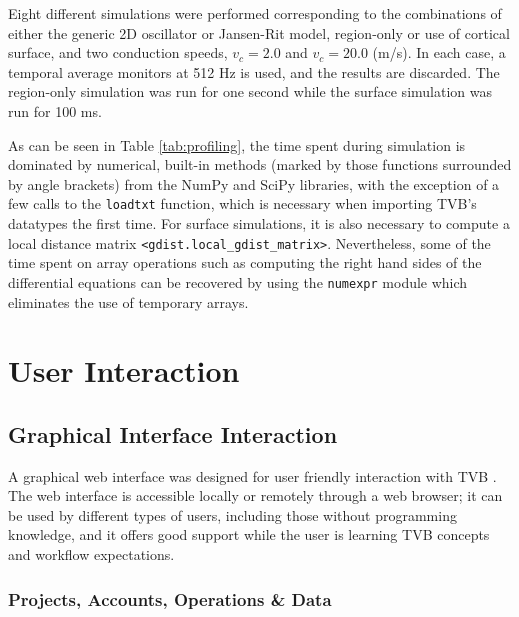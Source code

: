 \documentclass{bioinfo}
\begin{document}
	Eight different simulations were performed corresponding to the combinations of
	either the generic 2D oscillator or Jansen-Rit model, region-only
	or use of cortical surface, and two conduction speeds, $v_c = 2.0$ and
	$v_c = 20.0$ (m/s). In each case, a temporal average monitors at 512 Hz
	is used, and the results are discarded. The region-only simulation was
	run for one second while the surface simulation was run for 100 ms. 

	

	As can be seen in Table \ref{tab:profiling}, the time spent during simulation
	is dominated by numerical, built-in methods (marked by those functions surrounded by angle
	brackets) from the NumPy and SciPy libraries, with the exception of a few
	calls to the \texttt{loadtxt} function, which is necessary when importing TVB's
	datatypes the first time. For surface simulations, it is also necessary to compute
	a local distance matrix \texttt{<gdist.local\_gdist\_matrix>}. Nevertheless, 
	some of the time spent on array operations such as computing the right hand sides 
	of the differential equations can be 
	recovered by using the \texttt{numexpr} module which eliminates the 
	use of temporary arrays. 


%	

\section{User Interaction}

\subsection{Graphical Interface Interaction}

		A graphical web interface was designed for user friendly
		interaction with TVB . The web interface is accessible locally or
		remotely through a web browser; it can be used by different types of
		users, including those without programming knowledge, and it offers
		good support while the user is learning TVB concepts and workflow
		expectations.  

		\subsubsection{Projects, Accounts, Operations \& Data}
\end{document}
